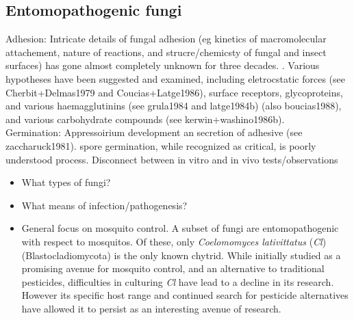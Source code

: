 \subsection{Entomopathogenic fungi}
Adhesion: Intricate details of fungal adhesion (eg kinetics of macromolecular attachement, nature of reactions, and strucre/chemicsty of fungal and insect surfaces) has gone almost completely unknown for three decades. \cite{atlasBook}. Various hypotheses have been suggested and examined, including eletrocstatic forces  (see Cherbit+Delmas1979 and Coucias+Latge1986), surface receptors, glycoproteins, and various haemagglutinins (see grula1984 and latge1984b) (also boucias1988), and various carbohydrate compounds (see kerwin+washino1986b). \\
\indent Germination: Appressoirium development an secretion of adhesive (see zaccharuck1981). spore germination, while recognized as critical, is poorly understood process. Disconnect between in vitro and in vivo tests/observations\\
\indent 
\begin{itemize}
  \item What types of fungi?
  \item What means of infection/pathogenesis?
  \item General focus on mosquito control. A subset of fungi are entomopathogenic with respect to mosquitos. Of these, only \textit{Coelomomyces lativittatus} (\textit{Cl}) (Blastocladiomycota) is the only known chytrid. While initially studied as a promising avenue for mosquito control, and an alternative to traditional pesticides, difficulties in culturing \textit{Cl} have lead to a decline in its research. However its specific host range and continued search for pesticide alternatives have allowed it to persist as an interesting avenue of research.\\
\end{itemize}

